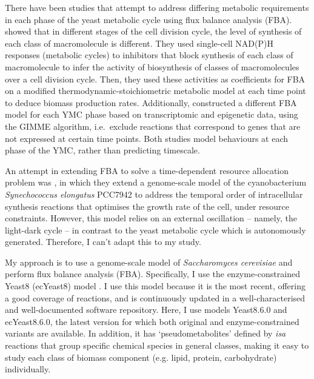 There have been studies that attempt to address differing metabolic requirements in each phase of the yeast metabolic cycle using flux balance analysis (FBA).
\textcite{takhaveevTemporalSegregationBiosynthetic2023} showed that in different stages of the cell division cycle, the level of synthesis of each class of macromolecule is different.
They used single-cell NAD(P)H responses (metabolic cycles) to inhibitors that block synthesis of each class of macromolecule to infer the activity of biosynthesis of classes of macromolecules over a cell division cycle.
Then, they used these activities as coefficients for FBA on a modified thermodynamic-stoichiometric metabolic model at each time point to deduce biomass production rates.
Additionally, \textcite{cesurGenomeWideAnalysisYeast} constructed a different FBA model for each YMC phase based on transcriptomic and epigenetic data, using the GIMME algorithm, i.e.\ exclude reactions that correspond to genes that are not expressed at certain time points.
Both studies model behaviours at each phase of the YMC, rather than predicting timescale.

An attempt in extending FBA to solve a time-dependent resource allocation problem was \textcite{reimersCellularTradeoffsOptimal2017}, in which they extend a genome-scale model of the cyanobacterium \emph{Synechococcus elongatus} PCC7942 to address the temporal order of intracellular synthesis reactions that optimises the growth rate of the cell, under resource constraints.
However, this model relies on an external oscillation -- namely, the light-dark cycle -- in contrast to the yeast metabolic cycle which is autonomously generated.
Therefore, I can't adapt this to my study.

My approach is to use a genome-scale model of \emph{Saccharomyces cerevisiae} and perform flux balance analysis (FBA).
Specifically, I use the enzyme-constrained Yeast8 (ecYeast8) model \parencite{luConsensusCerevisiaeMetabolic2019}.
I use this model because it is the most recent, offering a good coverage of reactions, and is continuously updated in a well-characterised and well-documented software repository.
Here, I use models Yeast8.6.0 and ecYeast8.6.0, the latest version for which both original and enzyme-constrained variants are available.
In addition, it has `pseudometabolites' defined by \emph{isa} reactions \parencite{heavnerYeastExpandedReconstruction2012} that group specific chemical species in general classes, making it easy to study each class of biomass component (e.g. lipid, protein, carbohydrate) individually.

